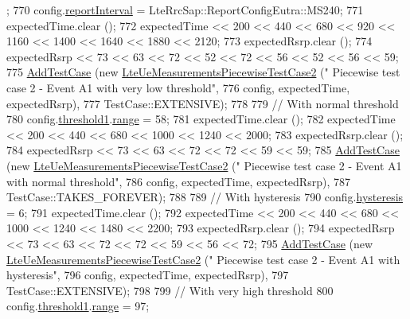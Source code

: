 \begin{DoxyCode}
      ;
770   config.\hyperlink{structns3_1_1LteRrcSap_1_1ReportConfigEutra_a8688bf528a9f1a027fe8570965adacdb}{reportInterval} = LteRrcSap::ReportConfigEutra::MS240;
771   expectedTime.clear ();
772   expectedTime << 200 << 440 << 680 << 920 << 1160 << 1400 << 1640 << 1880 << 2120;
773   expectedRsrp.clear ();
774   expectedRsrp << 73 << 63 << 72 << 52 << 72 << 56 << 52 << 56 << 59;
775   \hyperlink{classns3_1_1TestCase_a3718088e3eefd5d6454569d2e0ddd835}{AddTestCase} (\textcolor{keyword}{new} \hyperlink{classLteUeMeasurementsPiecewiseTestCase2}{LteUeMeasurementsPiecewiseTestCase2} (\textcolor{stringliteral}{"
      Piecewise test case 2 - Event A1 with very low threshold"},
776                                                         config, expectedTime, expectedRsrp),
777                TestCase::EXTENSIVE);
778 
779   \textcolor{comment}{// With normal threshold}
780   config.\hyperlink{structns3_1_1LteRrcSap_1_1ReportConfigEutra_a8f36bc45a61054920e490be8bf33b4ca}{threshold1}.\hyperlink{structns3_1_1LteRrcSap_1_1ThresholdEutra_abd4950e20a1a93727535e8364bf85b03}{range} = 58;
781   expectedTime.clear ();
782   expectedTime << 200 << 440 << 680 << 1000 << 1240 << 2000;
783   expectedRsrp.clear ();
784   expectedRsrp << 73 << 63 << 72 << 72 << 59 << 59;
785   \hyperlink{classns3_1_1TestCase_a3718088e3eefd5d6454569d2e0ddd835}{AddTestCase} (\textcolor{keyword}{new} \hyperlink{classLteUeMeasurementsPiecewiseTestCase2}{LteUeMeasurementsPiecewiseTestCase2} (\textcolor{stringliteral}{"
      Piecewise test case 2 - Event A1 with normal threshold"},
786                                                         config, expectedTime, expectedRsrp),
787                TestCase::TAKES\_FOREVER);
788 
789   \textcolor{comment}{// With hysteresis}
790   config.\hyperlink{structns3_1_1LteRrcSap_1_1ReportConfigEutra_a1fb9169ea261ba20af6a0c18fcc04fa9}{hysteresis} = 6;
791   expectedTime.clear ();
792   expectedTime << 200 << 440 << 680 << 1000 << 1240 << 1480 << 2200;
793   expectedRsrp.clear ();
794   expectedRsrp << 73 << 63 << 72 << 72 << 59 << 56 << 72;
795   \hyperlink{classns3_1_1TestCase_a3718088e3eefd5d6454569d2e0ddd835}{AddTestCase} (\textcolor{keyword}{new} \hyperlink{classLteUeMeasurementsPiecewiseTestCase2}{LteUeMeasurementsPiecewiseTestCase2} (\textcolor{stringliteral}{"
      Piecewise test case 2 - Event A1 with hysteresis"},
796                                                         config, expectedTime, expectedRsrp),
797                TestCase::EXTENSIVE);
798 
799   \textcolor{comment}{// With very high threshold}
800   config.\hyperlink{structns3_1_1LteRrcSap_1_1ReportConfigEutra_a8f36bc45a61054920e490be8bf33b4ca}{threshold1}.\hyperlink{structns3_1_1LteRrcSap_1_1ThresholdEutra_abd4950e20a1a93727535e8364bf85b03}{range} = 97;

\end{DoxyCode}
